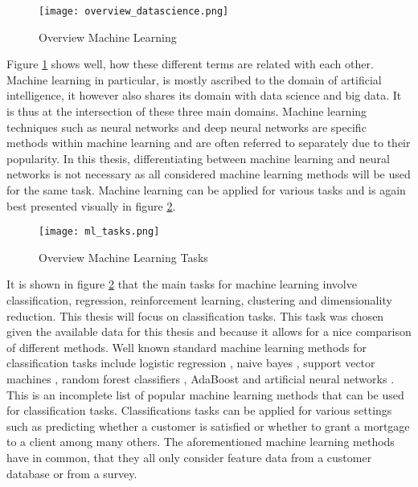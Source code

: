 	\begin{figure}[h]
		\centering
		\texttt{[image: overview\_datascience.png]}
		\caption{Overview Machine Learning}
		\cite{Frauenhofer2021}
		\label{fig:ml_overview}
	\end{figure} 

	\noindent Figure \ref{fig:ml_overview} shows well, how these different
	terms are related with each other. Machine learning in particular, is
	mostly ascribed to the domain of artificial intelligence, it however also
	shares its domain with data science and big data. It is thus at the
	intersection of these three main domains. Machine learning techniques such
	as neural networks and deep neural networks are specific methods within
	machine learning and are often referred to separately due to their
	popularity. In this thesis, differentiating between machine learning and
	neural networks is not necessary as all considered machine learning methods
	will be used for the same task. Machine learning can be applied for various
	tasks and is again best presented visually in figure \ref{fig:ml_tasks}.

	\begin{figure}[h]
		\centering
		\texttt{[image: ml\_tasks.png]}
		\caption{Overview Machine Learning Tasks}
		\cite{Artisan2020}
		\label{fig:ml_tasks}
	\end{figure} 

	\noindent It is shown in figure \ref{fig:ml_tasks} that the main tasks for
	machine learning involve classification, regression, reinforcement
	learning, clustering and dimensionality reduction. This thesis will focus
	on classification tasks. This task was chosen given the available data for
	this thesis and because it allows for a nice comparison of different
	methods. Well known standard machine learning methods for classification tasks
	include logistic regression \citep{cramer2002origins}, naive bayes
	\citep{zhang2004bayes}, support vector machines
	\citep{platt1999probabilistic}, random forest classifiers
	\citep{breiman2001random}, AdaBoost \citep{freund1997decision} and
	artificial neural networks \citep{mcculloch1943logical}. This is an
	incomplete list of popular machine learning methods that can be used for
	classification tasks. Classifications tasks can be applied for various
	settings such as predicting whether a customer is satisfied or whether to
	grant a mortgage to a client among many others. The aforementioned machine
	learning methods have in common, that they all only consider feature data
	from a customer database or from a survey. \\

